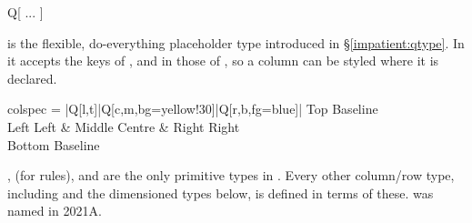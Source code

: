 \begin{codedescribe}[
    code,
    new=2021B
  ]{Q[ ... ]}
  \begin{codesyntax}
    \tsverb{Q[}\tsverb{]}
  \end{codesyntax}
   is the flexible, do-everything placeholder type introduced in \S\ref{impatient:qtype}. In  it accepts the keys of , and in  those of , so a column can be styled where it is declared.

  \begin{codestore}[st=types:q]
    \begin{tblr}{
      colspec = {|Q[l,t]|Q[c,m,bg=yellow!30]|Q[r,b,fg=blue]|}
      }
      \hline
      {Top Baseline \\Left Left} & Middle Centre & {Right Right\\Bottom Baseline} \\
      \hline
    \end{tblr}\end{codestore}
  \begin{center}
  \end{center}
  \begin{tsremark}
    , \tsverb{|} (for rules), \tsverb{<} and \tsverb{>} are the only primitive types in . Every other column/row type, including  and the dimensioned types below, is defined in terms of these.  was named  in 2021A.
  \end{tsremark}
\end{codedescribe}


